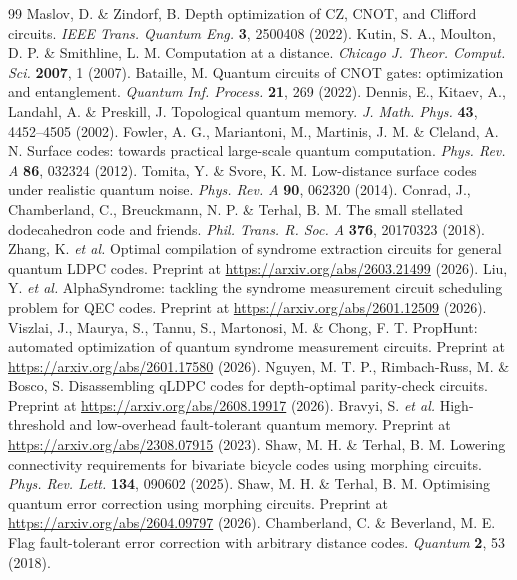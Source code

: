 \documentclass[reprint,twocolumn,superscriptaddress,nofootinbib]{revtex4-2}
\theoremstyle{plain}
\begin{document}
\begin{thebibliography}{99}
 Maslov, D. \& Zindorf, B. Depth optimization of CZ, CNOT, and Clifford circuits. \emph{IEEE Trans. Quantum Eng.} \textbf{3}, 2500408 (2022).
 Kutin, S. A., Moulton, D. P. \& Smithline, L. M. Computation at a distance. \emph{Chicago J. Theor. Comput. Sci.} \textbf{2007}, 1 (2007).
 Bataille, M. Quantum circuits of CNOT gates: optimization and entanglement. \emph{Quantum Inf. Process.} \textbf{21}, 269 (2022).
 Dennis, E., Kitaev, A., Landahl, A. \& Preskill, J. Topological quantum memory. \emph{J. Math. Phys.} \textbf{43}, 4452--4505 (2002).
 Fowler, A. G., Mariantoni, M., Martinis, J. M. \& Cleland, A. N. Surface codes: towards practical large-scale quantum computation. \emph{Phys. Rev. A} \textbf{86}, 032324 (2012).
 Tomita, Y. \& Svore, K. M. Low-distance surface codes under realistic quantum noise. \emph{Phys. Rev. A} \textbf{90}, 062320 (2014).
 Conrad, J., Chamberland, C., Breuckmann, N. P. \& Terhal, B. M. The small stellated dodecahedron code and friends. \emph{Phil. Trans. R. Soc. A} \textbf{376}, 20170323 (2018).
 Zhang, K. \emph{et al.} Optimal compilation of syndrome extraction circuits for general quantum LDPC codes. Preprint at \url{https://arxiv.org/abs/2603.21499} (2026).
 Liu, Y. \emph{et al.} AlphaSyndrome: tackling the syndrome measurement circuit scheduling problem for QEC codes. Preprint at \url{https://arxiv.org/abs/2601.12509} (2026).
 Viszlai, J., Maurya, S., Tannu, S., Martonosi, M. \& Chong, F. T. PropHunt: automated optimization of quantum syndrome measurement circuits. Preprint at \url{https://arxiv.org/abs/2601.17580} (2026).
 Nguyen, M. T. P., Rimbach-Russ, M. \& Bosco, S. Disassembling qLDPC codes for depth-optimal parity-check circuits. Preprint at \url{https://arxiv.org/abs/2608.19917} (2026).
 Bravyi, S. \emph{et al.} High-threshold and low-overhead fault-tolerant quantum memory. Preprint at \url{https://arxiv.org/abs/2308.07915} (2023).
 Shaw, M. H. \& Terhal, B. M. Lowering connectivity requirements for bivariate bicycle codes using morphing circuits. \emph{Phys. Rev. Lett.} \textbf{134}, 090602 (2025).
 Shaw, M. H. \& Terhal, B. M. Optimising quantum error correction using morphing circuits. Preprint at \url{https://arxiv.org/abs/2604.09797} (2026).
 Chamberland, C. \& Beverland, M. E. Flag fault-tolerant error correction with arbitrary distance codes. \emph{Quantum} \textbf{2}, 53 (2018).

\end{thebibliography}
\end{document}
